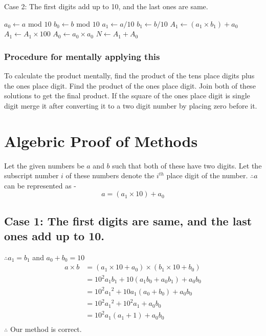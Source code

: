 \documentclass[12pt]{article}
\begin{document}
\begin{enumerate}

  \begin{algorithm}[H]
   \caption{Case 2: The first digits add up to 10, and the last ones are same.}
    \begin{algorithmic}[1]
       

        \State $a_0 \leftarrow a$ mod $10$
        \State $b_0 \leftarrow b$ mod $10$
        \State $a_1 \leftarrow a/10$
        \State $b_1 \leftarrow b/10$
            \Else 
                \State $A_1 \leftarrow (a_1 \times b_1) + a_0$
                \State $A_1 \leftarrow A_1 \times 100$
        		\State $A_0 \leftarrow a_0 \times a_0$
        		\State $N \leftarrow A_1 + A_0$
        	\EndIf

       \EndFunction

\end{algorithmic}
\end{algorithm}
\end{enumerate}
\subsubsection{Procedure for mentally applying this}
To calculate the product mentally, find the product of the tens place digits plus the ones place digit. Find the product of the ones place digit. Join both of these solutions to get the final product. If the square of the ones place digit is single digit merge it after converting it to a two digit number by placing zero before it.


\section{Algebric Proof of Methods}
Let the given numbers be $a$ and $b$ such that both of these have two digits. Let the subscript number $i$ of these numbers denote the $i^{th}$ place digit of the number.\newline
$\therefore a$ can be represented as - 
$$a = (a_1 \times 10) + a_0$$

\subsection{Case 1: The first digits are same, and the last ones add up to 10.}
$\therefore a_1 = b_1$ and $a_0 + b_0 = 10$
\begin{align*}
a \times b &= (a_1 \times 10 + a_0) \times (b_1 \times 10 + b_0)\\
&= 10^2a_1b_1 + 10(a_1b_0 + a_0b_1) + a_0b_0\\
&= 10^2{a_1}^2 + 10a_1(a_0 + b_0) + a_0b_0\\
&= 10^2{a_1}^2 + 10^2a_1 + a_0b_0\\
&= 10^2a_1(a_1 + 1) + a_0b_0\\
\end{align*}
$\therefore$ Our method is correct.
\end{document}
